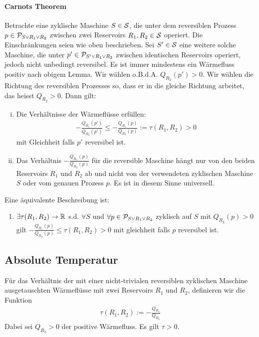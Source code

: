 \paragraph{Carnots Theorem}
Betrachte eine zyklische Maschine $S \in \S$, die unter dem reversiblen
Prozess $p \in \P_{S \vee R_1 \vee R_2}$ zwischen zwei Reservoirs $R_1,R_2
\in \S$ operiert. Die Einschränkungen seien wie oben beschrieben. Sei $S' \in
\S$ eine weitere solche Maschine, die unter $p' \in \P_{S' \vee R_1 \vee R_2}$
zwischen identischen Reservoirs operiert, jedoch nicht unbedingt reversibel.
Es ist immer mindestens ein Wärmefluss positiv nach obigem Lemma. Wir wählen
o.B.d.A. $Q_{R_2}(p') > 0$. Wir wählen die Richtung des reversiblen Prozesses
so, dass er in die gleiche Richtung arbeitet, das heisst $Q_{R_2} > 0$. Dann
gilt:
\begin{enumerate}[(i)]
    \item Die Verhältnisse der Wärmeflüsse erfüllen:
        \begin{align*}
            - \frac{Q_{R_1}(p')}{Q_{R_2}(p')} \leq - \frac{Q_{R_1}(p)}{Q_{R_2}(p)}
            := \tau(R_1,R_2) > 0
        \end{align*}
        mit Gleichheit falls $p'$ reversibel ist.
    \item Das Verhältnis $- \frac{Q_{R_1}(p)}{Q_{R_2}(p)}$ für die reversible
        Maschine hängt nur von den beiden Reservoirs $R_1$ und $R_2$ ab und
        nicht von der verwendeten zyklischen Maschine $S$ oder vom genauen
        Prozess $p$. Es ist in diesem Sinne universell.
\end{enumerate}
Eine äquivalente Beschreibung ist:
\begin{enumerate}[]
    \item $\exists \tau(R_1,R_2) \rightarrow \R$ s.d. $\forall S$ und
        $\forall p \in \P_{S \vee R_1 \vee R_2}$ zyklisch auf $S$ mit
        $Q_{R_2}(p) > 0$ gilt $- \frac{Q_{R_1}(p)}{Q_{R_2}(p)} \leq
        \tau(R_1,R_2) > 0$ mit gleichheit falls $p$ reversibel ist.
\end{enumerate}

\subsection{Absolute Temperatur}

\begin{definition}[$\tau$]
    Für das Verhältnis der mit einer nicht-trivialen reversiblen zyklischen
    Maschine ausgetauschten Wärmeflüsse mit zwei Reservoirs $R_1$ und $R_2$,
    definieren wir die Funktion
    \begin{align*}
        \tau(R_1,R_2) := - \frac{Q_{R_1}}{Q_{R_2}}
    \end{align*}
    Dabei sei $Q_{R_2} > 0$ der positive Wärmefluss. Es gilt $\tau > 0$.
\end{definition}

